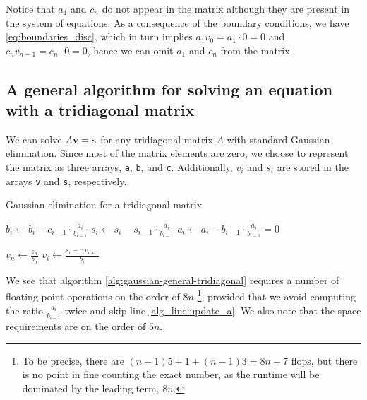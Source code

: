 \documentclass[a4paper]{article}
\begin{document}
Notice that $a_1$ and $c_{n}$ do not appear in the matrix although they are present in the system of equations. As a consequence of the boundary conditions, we have \eqref{eq:boundaries_disc}, which in turn implies $a_1 v_{0} = a_1 \cdot 0 = 0$ and $c_n v_{n+1} = c_n \cdot 0 = 0$, hence we can omit $a_1$ and $c_{n}$ from the matrix.



\subsection{A general algorithm for solving an equation with a tridiagonal matrix}\label{subsec:gen_alg}
We can solve $A {\bf v} = {\bf s}$ for any tridiagonal matrix $A$ with standard Gaussian elimination. Since most of the matrix elements are zero, we choose to represent the matrix as three arrays, \texttt{a}, \texttt{b}, and \texttt{c}. Additionally, $v_{i}$ and $s_i$ are stored in the arrays \texttt{v} and \texttt{s}, respectively.

\begin{algorithm}
\caption{Gaussian elimination for a tridiagonal matrix} \label{alg:gaussian-general-tridiagonal}
\begin{algorithmic}[1]
   
    \State $b_i \gets b_i - c_{i-1}\cdot \frac{a_i}{b_{i-1}}$ 
    \State $s_i \gets s_i - s_{i-1}\cdot \frac{a_i}{b_{i-1}}$ 
    \State $a_i \gets a_i - b_{i-1}\cdot \frac{a_i}{b_{i-1}} = 0$  \label{alg_line:update_a}
  \EndFor

  \Statex {}
  \State $v_n \gets \frac{s_n}{b_n}$
    \State $v_i \gets \frac{s_i - c_i v_{i+1}}{b_i}$
  \EndFor
\end{algorithmic}
\end{algorithm}

We see that algorithm \ref{alg:gaussian-general-tridiagonal} requires a number of floating point operations on the order of $8n$ \footnote{To be precise, there are $(n-1)5 + 1 + (n-1)3 = 8n-7$ flops, but there is no point in fine counting the exact number, as the runtime will be dominated by the leading term, $8n$.}, provided that we avoid computing the ratio $\frac{a_i}{b_{i-1}}$ twice and skip line \ref{alg_line:update_a}.
We also note that the space requirements are on the order of $5n$.
\end{document}
